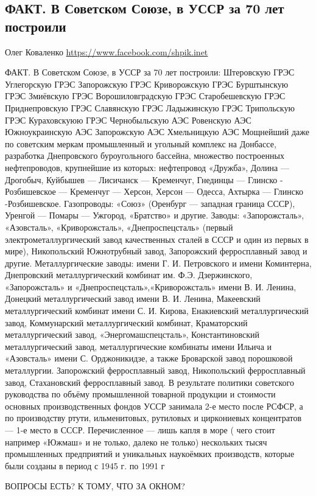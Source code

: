  

 

\subsection{ФАКТ. В Советском Союзе, в УССР за 70 лет построили}
\label{sec:13_10_2020.fb.oleg_kovalenko.1_ussr}

Олег Коваленко
\url{https://www.facebook.com/shpik.inet}

ФАКТ. В Советском Союзе, в УССР за 70 лет построили:
Штеровскую ГРЭС
Углегорскую ГРЭС
Запорожскую ГРЭС
Криворожскую ГРЭС
Бурштынскую ГРЭС
Змиёвскую ГРЭС
Ворошиловградскую ГРЭС
Старобешевскую ГРЭС
Приднепровскую ГРЭС
Славянскую ГРЭС
Ладыжинскую ГРЭС
Трипольскую ГРЭС
Кураховскуюю ГРЭС
Чернобыльскую АЭС
Ровенскую АЭС
Южноукраинскую АЭС
Запорожскую АЭС
Хмельницкую АЭС
Мощнейший даже по советским меркам промышленный и угольный комплекс на Донбассе, разработка Днепровского буроугольного бассейна, множество построенных нефтепроводов, крупнейшие из которых: 
нефтепровод «Дружба», Долина --- Дрогобыч, Куйбышев --- Лисичанск --- Кременчуг, Гнединцы --- Глинско - Розбишевское --- Кременчуг --- Херсон, Херсон --- Одесса, Ахтырка --- Глинско -Розбишевское. 
Газопроводы: «Союз» (Оренбург --- западная граница СССР), Уренгой --- Помары --- Ужгород, «Братство» и другие.
Заводы:
«Запорожсталь», «Азовсталь», «Криворожсталь», «Днепроспецсталь» (первый электрометаллургический завод качественных сталей в СССР и один из первых в мире), Никопольский Южнотрубный завод, Запорожский ферросплавный завод и другие.
Металлургические заводы:
имени Г. И. Петровского и имени Коминтерна, Днепровский металлургический комбинат им. Ф.Э. Дзержинского, «Запорожсталь» и «Днепроспецсталь»,«Криворожсталь» имени В. И. Ленина,
Донецкий металлургический завод имени В. И. Ленина, Макеевский металлургический комбинат имени С. И. Кирова, Енакиевский металлургический завод, Коммунарский металлургический комбинат, Краматорский металлургический завод, «Энергомашспецсталь», Константиновский металлургический завод, металлургические комбинаты имени Ильича и «Азовсталь» имени С. Орджоникидзе,
а также Броварской завод порошковой металлургии.
Запорожский ферросплавный завод, Никопольский ферросплавный завод, Стахановский ферросплавный завод.
В результате политики советского руководства по объёму промышленной товарной продукции и стоимости основных производственных фондов УССР занимала 2-е место после РСФСР, а по производству ртути, ильменитовых, рутиловых и циркониевых концентратов --- 1-е место в СССР.
Перечисленное --- лишь капля в море ( чего стоит например «Южмаш» и не только, далеко не только) нескольких тысяч промышленных предприятий и уникальных наукоёмких производств, которые были созданы в период с 1945 г. по 1991 г

ВОПРОСЫ ЕСТЬ? К ТОМУ, ЧТО ЗА ОКНОМ?

